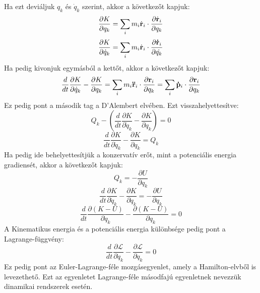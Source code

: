 \documentclass[a4paper,12pt]{article}
\begin{document}
Ha ezt deviáljuk $q_k$ és $\dot{q}_k$ szerint, akkor a következőt kapjuk:
\begin{equation}
    \frac{\partial K}{\partial q_k} = \sum_i m_i \dot{\bold{r}}_i \cdot \frac{\partial \dot{\bold{r}}_i}{\partial q_k}
\end{equation}
\begin{equation}
    \frac{\partial K}{\partial \dot{q}_k} = \sum_i m_i \dot{\bold{r}}_i \cdot \frac{\partial \bold{\dot{r}}_i}{\partial \dot{q_k}}
\end{equation}
Ha pedig kivonjuk egymásból a kettőt, akkor a következőt kapjuk:
\begin{equation}
    \frac{d}{dt} \frac{\partial K}{\partial \dot{q}_k} - \frac{\partial K}{\partial q_k} = \sum_i m_i \bold{\ddot{r}}_i \cdot \frac{\partial \bold{r}_i}{\partial q_k} = \sum_i \bold{\dot{p}}_i \cdot \frac{\partial \bold{r}_i}{\partial q_k}
\end{equation}
Ez pedig pont a második tag a D'Alembert elvében. Ezt visszahelyettesítve:
\begin{equation}
    Q_k - \left( \frac{d}{dt} \frac{\partial K}{\partial \dot{q}_k} - \frac{\partial K}{\partial q_k} \right) = 0
\end{equation}
\begin{equation}
    \frac{d}{dt} \frac{\partial K}{\partial \dot{q}_k} - \frac{\partial K}{\partial q_k} = Q_k
\end{equation}
Ha pedig ide behelyettesítjük a konzervatív erőt, mint a potenciális energia gradiensét, akkor a következőt kapjuk:
\begin{equation}
    Q_k = - \frac{\partial U}{\partial q_k}
\end{equation}
\begin{equation}
    \frac{d}{dt} \frac{\partial K}{\partial \dot{q}_k} - \frac{\partial K}{\partial q_k} = - \frac{\partial U}{\partial q_k}
\end{equation}
\begin{equation}
    \frac{d}{dt} \frac{\partial (K - U)}{\partial \dot{q}_k} - \frac{\partial (K - U)}{\partial q_k} = 0
\end{equation}
A Kinematikus energia és a potenciális energia különbsége pedig pont a Lagrange-függvény:
\begin{equation}
    \frac{d}{dt} \frac{\partial \mathcal{L}}{\partial \dot{q}_k} - \frac{\partial \mathcal{L}}{\partial q_k} = 0
\end{equation}
Ez pedig pont az Euler-Lagrange-féle mozgásegyenlet, amely a Hamilton-elvből is levezethető. Ezt az egyenletet Lagrange-féle másodfajú egyenletnek nevezzük dinamikai rendszerek esetén.
\end{document}
